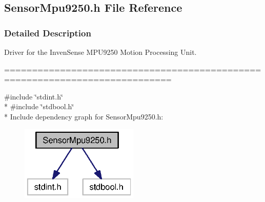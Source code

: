 \subsection{Sensor\+Mpu9250.\+h File Reference}
\label{_sensor_mpu9250_8h}


\subsubsection{Detailed Description}
Driver for the Inven\+Sense M\+P\+U9250 Motion Processing Unit. 

============================================================================



{\ttfamily \#include \char`\"{}stdint.\+h\char`\"{}}\\*
{\ttfamily \#include \char`\"{}stdbool.\+h\char`\"{}}\\*
Include dependency graph for Sensor\+Mpu9250.\+h\+:
\nopagebreak
\begin{figure}[H]
\begin{center}
\leavevmode
\includegraphics[width=159pt]{_sensor_mpu9250_8h__incl}
\end{center}
\end{figure}
